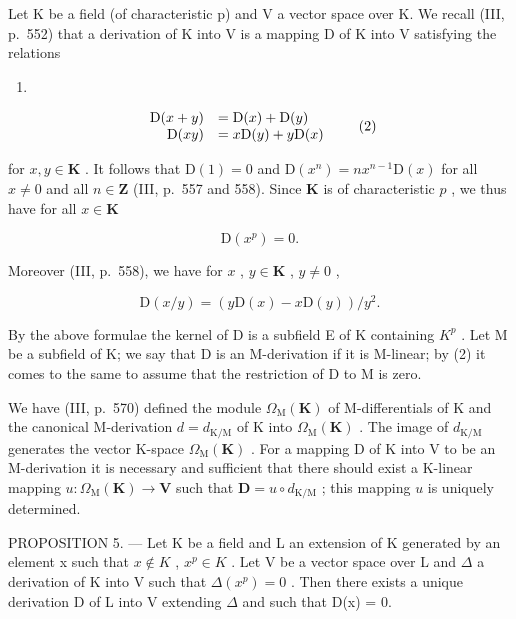 Let K be a field (of characteristic p) and V a vector space over K. We recall (III, p.~552) that a derivation of K into V is a mapping D of K into V satisfying the relations

\begin{enumerate}
\def\labelenumi{(\arabic{enumi})}
\tightlist
\item
\end{enumerate}

\[
\begin{array}{r l} \mathrm{D} (x + y) & = \mathrm{D} (x) + \mathrm{D} (y) \\ \mathrm{D} (x y) & = x \mathrm{D} (y) + y \mathrm{D} (x) \end{array}\tag{2}
\]

for \(x, y \in \mathbf{K}\) . It follows that \(\mathrm{D}(1) = 0\) and \(\mathrm{D}(x^n) = nx^{n-1}\mathrm{D}(x)\) for all \(x \neq 0\) and all \(n \in \mathbf{Z}\) (III, p.~557 and 558). Since \(\mathbf{K}\) is of characteristic \(p\) , we thus have for all \(x \in \mathbf{K}\)

\[
\mathrm{D} \left(x ^ {p}\right) = 0.\tag{3}
\]

Moreover (III, p.~558), we have for \(x\) , \(y \in \mathbf{K}\) , \(y \neq 0\) ,

\[
\mathrm{D} (x / y) = \left(y \mathrm{D} (x) - x \mathrm{D} (y)\right) / y ^ {2}.\tag{4}
\]

By the above formulae the kernel of D is a subfield E of K containing \(K^{p}\) . Let M be a subfield of K; we say that D is an M-derivation if it is M-linear; by (2) it comes to the same to assume that the restriction of D to M is zero.

We have (III, p.~570) defined the module \(\Omega_{\mathrm{M}}(\mathbf{K})\) of M-differentials of K and the canonical M-derivation \(d = d_{\mathrm{K / M}}\) of K into \(\Omega_{\mathrm{M}}(\mathbf{K})\) . The image of \(d_{\mathrm{K / M}}\) generates the vector K-space \(\Omega_{\mathrm{M}}(\mathbf{K})\) . For a mapping D of K into V to be an M-derivation it is necessary and sufficient that there should exist a K-linear mapping \(u: \Omega_{\mathrm{M}}(\mathbf{K}) \to \mathbf{V}\) such that \(\mathbf{D} = u \circ d_{\mathrm{K / M}}\) ; this mapping \(u\) is uniquely determined.

PROPOSITION 5. --- Let K be a field and L an extension of K generated by an element x such that \(x \notin K\) , \(x^{p} \in K\) . Let V be a vector space over L and \(\Delta\) a derivation of K into V such that \(\Delta(x^{p}) = 0\) . Then there exists a unique derivation D of L into V extending \(\Delta\) and such that D(x) = 0.

